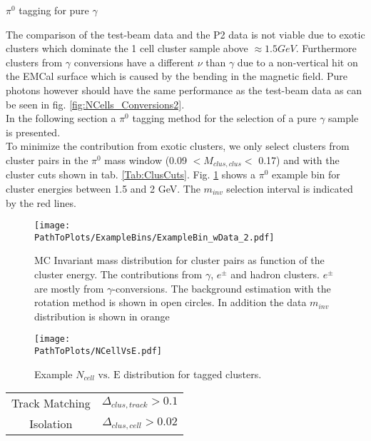 \documentclass[ALICE]{ALICE_analysis_notes}
\newcommand{\PZ}{$\pi^0$\xspace}
\newcommand{\g}{$\gamma$\xspace}
\newcommand{\PathToPlots}{/home/joshua/PCG_Software/EMCal_NCellEffi/13TeVNomB_Wide/Pi0Tagging_13TeV_nom_04_26_WithTRD_WithBorderCells_1cellFT/pdf}
\begin{document}
\begin{section}{\PZ tagging for pure \g}
	\label{sec:tagging}



The comparison of the test-beam data and the P2 data is not viable due to exotic clusters which dominate the 1 cell cluster sample above $\approx 1.5 GeV$. Furthermore clusters from \g conversions have a different $\nu$ than \g due to a non-vertical hit on the EMCal surface which is caused by the bending in the magnetic field. Pure photons however should have the same performance as the test-beam data as can be seen in fig. \ref{fig:NCells_Conversions2}. \\
In the following section a \PZ tagging method for the selection of a pure \g sample is presented.\\
To minimize the contribution from exotic clusters, we only select clusters from cluster pairs in the \PZ mass window (0.09 $< M_{clus, clus} <$ 0.17) and with the cluster cuts shown in tab. \ref{Tab:ClusCuts}. Fig. \ref{fig:Pi0InvMass} shows a \PZ example bin for cluster energies between 1.5 and 2 GeV. The $m_{inv}$ selection interval is indicated by the red lines.
\begin{figure}[ht!]
	\centering
	\texttt{[image: \\PathToPlots/ExampleBins/ExampleBin\_wData\_2.pdf]}	
	
	\caption{  MC Invariant mass distribution for cluster pairs as function of the cluster energy. The contributions from \g, $e^{\pm}$ and hadron clusters. $e^{\pm}$ are mostly from \g-conversions. The background estimation with the rotation method is shown in open circles. In addition the data $m_{inv}$ distribution is shown in orange }
	\label{fig:Pi0InvMass}
\end{figure}

\begin{figure}[ht!]
	\centering
	\texttt{[image: \\PathToPlots/NCellVsE.pdf]}	
	
	\caption{  Example $N_{cell}\text{ vs. E}$ distribution for tagged clusters. }
	\label{fig:NCellVsE}
\end{figure}


\begin{table}[ht!]
	\centering
	\begin{tabular}{ c c }
		\hline
		Track Matching & $\Delta_{clus, track} > 0.1$ \\ 
		Isolation & $\Delta_{clus, cell} > 0.02$ \\
		\hline
		

\end{tabular}
\end{table}
\end{section}
\end{document}
